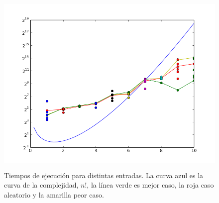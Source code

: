 \begin{figure}[h!]
  \centering
  \includegraphics[width=12cm, height=9cm]{HameTime}
  \caption{Tiempos de ejecución para distintas entradas. La curva azul es la curva de la complejidad, $n!$, la línea verde es mejor caso, la roja caso aleatorio y la amarilla peor caso.}
\end{figure}

\newpage
